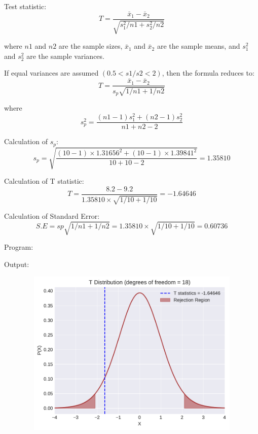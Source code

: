 \documentclass[a4paper,11pt,openright]{report}
\begin{document}
\begin{enumerate}
Test statistic: 
\begin{equation*}
		T = \frac{\bar x_{1} - \bar x_{2}}{\sqrt{s_{1}^{2}/n1 + s_{2}^{2}/n2}}
\end{equation*}

where $n1$ and $n2$ are the sample sizes, $\bar x_{1}$ and $\bar x_{2}$ are the sample
means, and $s_{1}^{2}$ and $s_{2}^{2}$ are the sample variances. 

If equal variances are assumed $(0.5 < s1/s2 < 2)$, then the formula reduces to:
\begin{equation*}
T = \frac{\bar x_{1} - \bar x_{2}}{s_{p} \sqrt{1/n1 + 1/n2}}
\end{equation*}

where
\begin{equation*}
s_{p}^{2} = \frac{(n1-1)s_{1}^{2} + (n2-1)s_{2}^{2}}{n1+n2-2}
\end{equation*}

Calculation of $s_{p}$:
\begin{equation*}
s_{p} = \sqrt{\frac{(10-1) \times 1.31656^{2} + (10-1) \times 1.39841^{2}}{10+10-2}} 
      = 1.35810
\end{equation*}

Calculation of T statistic:
\begin{equation*}
T = \frac{8.2 - 9.2}{1.35810 \times \sqrt{1/10 + 1/10}} = -1.64646
\end{equation*}

Calculation of Standard Error:
\begin{equation*}
S.E = sp \sqrt{1/n1 + 1/n2} = 1.35810 \times \sqrt{1/10 + 1/10} = 0.60736
\end{equation*}

\vspace{3cm}

Program:


\vspace{2cm}

Output:


\begin{figure}[ht!]
\includegraphics[width=16cm,height=8cm,keepaspectratio]{tscript3.pdf}
\centering
\end{figure}


\end{enumerate}
\end{document}
